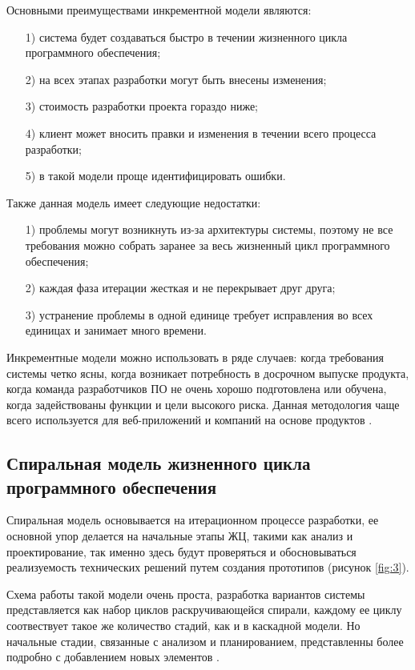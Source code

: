 Основными преимуществами инкрементной модели являются: 

\begin{enumerate}
    \item [1)] система будет создаваться быстро в течении жизненного цикла программного обеспечения;
    \item [2)] на всех этапах разработки могут быть внесены изменения;
    \item [3)] стоимость разработки проекта гораздо ниже;
    \item [4)] клиент может вносить правки и изменения в течении всего процесса разработки;
    \item [5)] в такой модели проще идентифицировать ошибки.
\end{enumerate}

Также данная модель имеет следующие недостатки: 

\begin{enumerate}
    \item [1)] проблемы могут возникнуть из-за архитектуры системы, поэтому не все требования можно собрать заранее за весь жизненный цикл программного обеспечения;
    \item [2)] каждая фаза итерации жесткая и не перекрывает друг друга;
    \item [3)] устранение проблемы в одной единице требует исправления во всех единицах и занимает много времени.
\end{enumerate}

Инкрементные модели можно использовать в ряде случаев: когда требования системы четко ясны, когда возникает потребность в досрочном выпуске продукта, когда команда разработчиков ПО не очень хорошо подготовлена или обучена, когда задействованы функции и цели высокого риска. Данная методология чаще всего используется для веб-приложений и компаний на основе продуктов \cite{21}.

\subsection{Спиральная модель жизненного цикла программного обеспечения}

Спиральная модель основывается на итерационном процессе разработки, ее основной упор делается на начальные этапы ЖЦ, такими как анализ и проектирование, так именно здесь будут проверяться и обосновываться реализуемость технических решений путем создания прототипов (рисунок \ref{fig:3}). 

Схема работы такой модели очень проста, разработка вариантов системы представляется как набор циклов раскручивающейся спирали, каждому ее циклу соотвествует такое же количество стадий, как и в каскадной модели. Но начальные стадии, связанные с анализом и планированием, представленны более подробно с добавлением новых элементов \cite{13, 14}.

